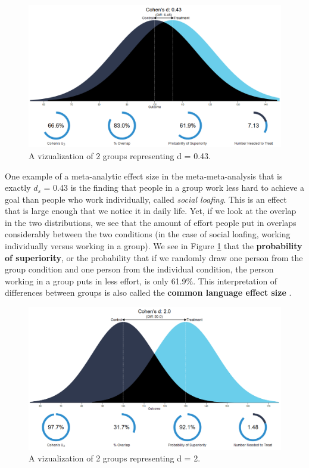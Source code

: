 \documentclass[
  oneside]{book}
\begin{document}
\begin{figure}

{\centering \includegraphics[width=1\linewidth]{images/rpsychd2} 

}

\caption{A vizualization of 2 groups representing d = 0.43.}\label{fig:rpsychd2}
\end{figure}

One example of a meta-analytic effect size in the meta-meta-analysis that is exactly \(d_s\) = 0.43 is the finding that people in a group work less hard to achieve a goal than people who work individually, called \emph{social loafing}. This is an effect that is large enough that we notice it in daily life. Yet, if we look at the overlap in the two distributions, we see that the amount of effort people put in overlaps considerably between the two conditions (in the case of social loafing, working individually versus working in a group). We see in Figure \ref{fig:rpsychd2} that the \textbf{probability of superiority}, or the probability that if we randomly draw one person from the group condition and one person from the individual condition, the person working in a group puts in less effort, is only 61.9\%. This interpretation of differences between groups is also called the \textbf{common language effect size} \citep{mcgraw_common_1992}.



\begin{figure}

{\centering \includegraphics[width=1\linewidth]{images/rpsychd3} 

}

\caption{A vizualization of 2 groups representing d = 2.}\label{fig:rpsychd3}
\end{figure}
\end{document}
